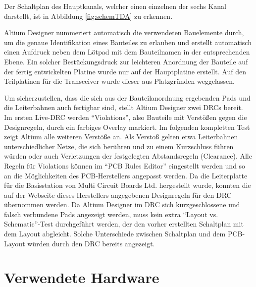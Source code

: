 Der Schaltplan des Hauptkanals, welcher einen einzelnen der sechs Kanal darstellt, ist in Abbildung \ref{fig:schemTDA} zu erkennen.


Altium Designer nummeriert automatisch die verwendeten  Bauelemente durch, um die genaue Identifikation eines Bauteiles zu erlauben und erstellt automatisch einen Aufdruck neben dem Lötpad mit dem Bauteilnamen in der entsprechenden Ebene. Ein solcher Bestückungsdruck zur leichteren Anordnung der Bauteile auf der fertig entwickelten Platine wurde nur auf der Hauptplatine erstellt. Auf den Teilplatinen für die Transceiver wurde dieser aus Platzgründen weggelassen.

Um sicherzustellen, dass die sich aus der Bauteilanordnung ergebenden Pads und die Leiterbahnen auch fertigbar sind, stellt Altium Designer zwei \acp{DRC}  bereit. Im ersten Live-\ac{DRC} werden \enquote{Violations}, also Bauteile mit Verstößen gegen die Designregeln, durch ein farbiges Overlay markiert. Im folgenden kompletten Test zeigt Altium alle weiteren Verstöße an. Als Verstoß gelten etwa Leiterbahnen unterschiedlicher Netze, die sich berühren und zu einem Kurzschluss führen würden oder auch  Verletzungen der festgelegten Abstandsregeln (Clearance). Alle Regeln für Violations können im \enquote{PCB Rules Editor} eingestellt werden und so an die Möglichkeiten des \ac{PCB}-Herstellers angepasst werden. Da die Leiterplatte für die Basisstation von Multi Circuit Boards Ltd. hergestellt wurde, konnten die auf der Webseite dieses Herstellers angegebenen Designregeln für den \ac{DRC} übernommen werden.
Da Altium Designer im \ac{DRC} sich kurzgeschlossene und falsch verbundene Pads angezeigt werden, muss kein extra \enquote{Layout vs. Schematic}-Test durchgeführt werden, der den vorher erstellten Schaltplan mit dem Layout abgleicht. Solche Unterschiede zwischen Schaltplan und dem \ac{PCB}-Layout würden durch den \ac{DRC} bereits angezeigt.

\section{Verwendete Hardware}

